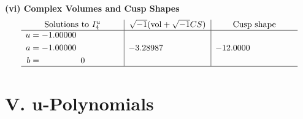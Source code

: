 \documentclass[1p]{elsarticle_modified}
\theoremstyle{definition}
\newcommand{\I}{\sqrt{-1}}
\begin{document}
\newpage\flushleft \textbf{(vi) Complex Volumes and Cusp Shapes}
$$\begin{array}{c|c|c}  
\text{Solutions to }I^u_{4}& \I (\text{vol} + \sqrt{-1}CS) & \text{Cusp shape}\\
 \hline 
\begin{aligned}
u &= -1.00000\phantom{ +0.000000I} \\
a &= -1.00000\phantom{ +0.000000I} \\
b &= \phantom{-0.000000 } 0\end{aligned}
 & -3.28987\phantom{ +0.000000I} & -12.0000\phantom{ +0.000000I}\\
 \hline 
 \end{array}$$\newpage
\newpage\renewcommand{\arraystretch}{1}
\centering \section*{ V. u-Polynomials}
\end{document}
